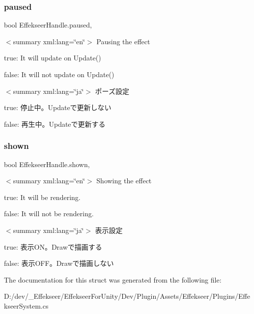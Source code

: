 \subsubsection{\texorpdfstring{paused}{paused}}
{\footnotesize\ttfamily bool Effekseer\+Handle.\+paused\hspace{0.3cm}{\ttfamily [get]}, {\ttfamily [set]}}

$<$summary xml\+:lang=\char`\"{}en\char`\"{}$>$ Pausing the effect 

true\+: It will update on Update()

false\+: It will not update on Update()

$<$summary xml\+:lang=\char`\"{}ja\char`\"{}$>$ ポーズ設定 

true\+: 停止中。\+Updateで更新しない

false\+: 再生中。\+Updateで更新する\mbox{\label{struct_effekseer_handle_a96d0ebfe4cab721aaea0992b1750ae43}} 
\subsubsection{\texorpdfstring{shown}{shown}}
{\footnotesize\ttfamily bool Effekseer\+Handle.\+shown\hspace{0.3cm}{\ttfamily [get]}, {\ttfamily [set]}}

$<$summary xml\+:lang=\char`\"{}en\char`\"{}$>$ Showing the effect 

true\+: It will be rendering.

false\+: It will not be rendering.

$<$summary xml\+:lang=\char`\"{}ja\char`\"{}$>$ 表示設定 

true\+: 表示\+O\+N。\+Drawで描画する

false\+: 表示\+O\+F\+F。\+Drawで描画しない

The documentation for this struct was generated from the following file\+:\begin{DoxyCompactItemize}
\item 
D\+:/dev/\+\_\+\+Effekseer/\+Effekseer\+For\+Unity/\+Dev/\+Plugin/\+Assets/\+Effekseer/\+Plugins/Effekseer\+System.\+cs\end{DoxyCompactItemize}
